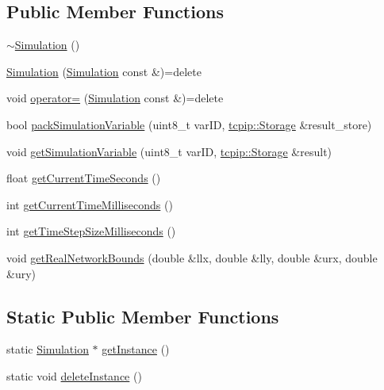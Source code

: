 \subsection*{Public Member Functions}
\begin{DoxyCompactItemize}
\item 
\hyperlink{classtraci__api_1_1_simulation_af0680bb9b12ef4c4d47e45f3aeebc108}{$\sim$\+Simulation} ()
\item 
\hyperlink{classtraci__api_1_1_simulation_a0e41f9a2911b8f3545002220027a9922}{Simulation} (\hyperlink{classtraci__api_1_1_simulation}{Simulation} const \&)=delete
\item 
void \hyperlink{classtraci__api_1_1_simulation_ad51b13fbeca39505efcb2171212ec99d}{operator=} (\hyperlink{classtraci__api_1_1_simulation}{Simulation} const \&)=delete
\item 
bool \hyperlink{classtraci__api_1_1_simulation_aa795b446802e3ddb196ebd29a215005e}{pack\+Simulation\+Variable} (uint8\+\_\+t var\+ID, \hyperlink{classtcpip_1_1_storage}{tcpip\+::\+Storage} \&result\+\_\+store)
\item 
void \hyperlink{classtraci__api_1_1_simulation_aa7ebe041dd0f34ccef7f2f2293775c3b}{get\+Simulation\+Variable} (uint8\+\_\+t var\+ID, \hyperlink{classtcpip_1_1_storage}{tcpip\+::\+Storage} \&result)
\item 
float \hyperlink{classtraci__api_1_1_simulation_a8e9cc88461dfab200eabf626fcdb8280}{get\+Current\+Time\+Seconds} ()
\item 
int \hyperlink{classtraci__api_1_1_simulation_a43ce3d282a312c2e6735cdcd4343b0a7}{get\+Current\+Time\+Milliseconds} ()
\item 
int \hyperlink{classtraci__api_1_1_simulation_a413eac30f40f25fabbd94cc6ff16a51c}{get\+Time\+Step\+Size\+Milliseconds} ()
\item 
void \hyperlink{classtraci__api_1_1_simulation_a1124e65809e0e3f6109654de9b28daf8}{get\+Real\+Network\+Bounds} (double \&llx, double \&lly, double \&urx, double \&ury)
\end{DoxyCompactItemize}
\subsection*{Static Public Member Functions}
\begin{DoxyCompactItemize}
\item 
static \hyperlink{classtraci__api_1_1_simulation}{Simulation} $\ast$ \hyperlink{classtraci__api_1_1_simulation_a5bd3febd1571525c2dac2b68e37f694e}{get\+Instance} ()
\item 
static void \hyperlink{classtraci__api_1_1_simulation_a952c6f62a424d4f8d3ee016dc8c935bd}{delete\+Instance} ()
\end{DoxyCompactItemize}
